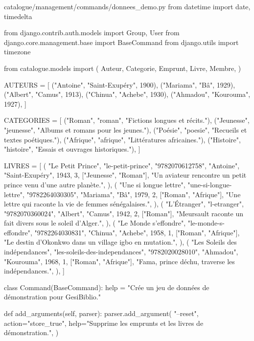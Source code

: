\begin{codebox}[python]{catalogue/management/commands/donnees\_demo.py}
from datetime import date, timedelta

from django.contrib.auth.models import Group, User
from django.core.management.base import BaseCommand
from django.utils import timezone

from catalogue.models import (
    Auteur,
    Categorie,
    Emprunt,
    Livre,
    Membre,
)

AUTEURS = [
    ("Antoine", "Saint-Exupéry", 1900),
    ("Mariama", "Bâ", 1929),
    ("Albert", "Camus", 1913),
    ("Chinua", "Achebe", 1930),
    ("Ahmadou", "Kourouma", 1927),
]

CATEGORIES = [
    ("Roman", "roman", "Fictions longues et récits."),
    ("Jeunesse", "jeunesse", "Albums et romans pour les jeunes."),
    ("Poésie", "poesie", "Recueils et textes poétiques."),
    ("Afrique", "afrique", "Littératures africaines."),
    ("Histoire", "histoire", "Essais et ouvrages historiques."),
]

LIVRES = [
    (
        "Le Petit Prince",
        "le-petit-prince",
        "9782070612758",
        "Antoine",
        "Saint-Exupéry",
        1943,
        3,
        ["Jeunesse", "Roman"],
        "Un aviateur rencontre un petit prince venu d'une autre planète.",
    ),
    (
        "Une si longue lettre",
        "une-si-longue-lettre",
        "9782264030305",
        "Mariama",
        "Bâ",
        1979,
        2,
        ["Roman", "Afrique"],
        "Une lettre qui raconte la vie de femmes sénégalaises.",
    ),
    (
        "L'Étranger",
        "l-etranger",
        "9782070360024",
        "Albert",
        "Camus",
        1942,
        2,
        ["Roman"],
        "Meursault raconte un fait divers sous le soleil d'Alger.",
    ),
    (
        "Le Monde s'effondre",
        "le-monde-s-effondre",
        "9782264030831",
        "Chinua",
        "Achebe",
        1958,
        1,
        ["Roman", "Afrique"],
        "Le destin d'Okonkwo dans un village igbo en mutation.",
    ),
    (
        "Les Soleils des indépendances",
        "les-soleils-des-independances",
        "9782020028010",
        "Ahmadou",
        "Kourouma",
        1968,
        1,
        ["Roman", "Afrique"],
        "Fama, prince déchu, traverse les indépendances.",
    ),
]


class Command(BaseCommand):
    help = "Crée un jeu de données de démonstration pour GesiBiblio."

    def add_arguments(self, parser):
        parser.add_argument(
            "--reset",
            action="store_true",
            help="Supprime les emprunts et les livres de démonstration.",
        )


\end{codebox}

